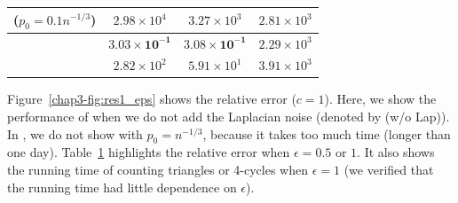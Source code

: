\begin{table}[t]
\begin{tabular}{|c|c|c|c|}
    \hspace{-0.5mm}\AlgARRTri{} ($p_0=0.1n^{-1/3}$)\hspace{-0.5mm} & $2.98 \times 10^4$ & $3.27 \times 10^3$ & $2.81 \times 10^3$ \\ \hline \hline
    \AlgWSCyc{} & $\bm{3.03 \times 10^{-1}}$ & $\bm{3.08 \times 10^{-1}}$ & $2.29 \times 10^3$ \\ \hline
    \AlgWLCyc{} & $2.82 \times 10^2$ & $5.91 \times 10^1$ & $3.91 \times 10^3$ \\ \hline
  \end{tabular}
  \label{chap3-tab:res1_eps_tri_time}
\end{table}

Figure~\ref{chap3-fig:res1_eps} shows the relative error ($c=1$). 
Here, we show the performance of \AlgWSTri{} when we do not add the Laplacian noise (denoted by \AlgWSTri{} (w/o Lap)). 
In \IMDB{}, we do not show \AlgARRTri{} with $p_0 = n^{-1/3}$, because it takes too much time (longer than one day). 
Table~\ref{chap3-tab:res1_eps_tri_time} highlights the relative error when $\epsilon=0.5$ or $1$. 
It also shows the running time of counting triangles or 4-cycles when $\epsilon=1$ (we verified that the running time had little dependence on $\epsilon$). 

